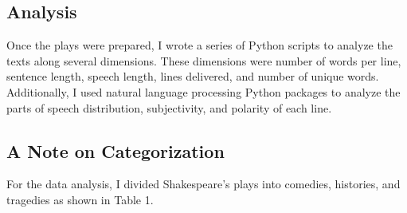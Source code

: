 \documentclass[12pt]{article} %
\begin{document}
\subsection{Analysis}
Once the plays were prepared, I wrote a series of Python scripts to analyze the texts along several dimensions. These dimensions were number of words per line, sentence length, speech length, lines delivered, and number of unique words. Additionally, I used natural language processing Python packages to analyze the parts of speech distribution, subjectivity, and polarity of each line.

\subsection{A Note on Categorization}
For the data analysis, I divided Shakespeare's  plays into comedies, histories, and tragedies as shown in Table 1.
\end{document}
